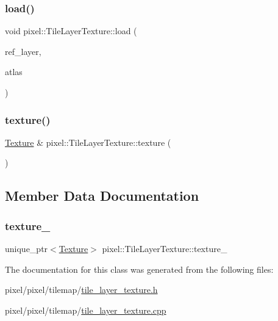 \subsubsection{\texorpdfstring{load()}{load()}}
{\footnotesize\ttfamily void pixel\+::\+Tile\+Layer\+Texture\+::load (\begin{DoxyParamCaption}\item[{\hyperlink{classpixel_1_1_tile_layer}{pixel\+::\+Tile\+Layer} \&}]{ref\+\_\+layer,  }\item[{\hyperlink{classpixel_1_1_tile_atlas}{pixel\+::\+Tile\+Atlas} \&}]{atlas }\end{DoxyParamCaption})}

\mbox{\label{classpixel_1_1_tile_layer_texture_a1523473ccda6c2cc6721aaaa0bce185e}} 
\subsubsection{\texorpdfstring{texture()}{texture()}}
{\footnotesize\ttfamily \hyperlink{classpixel_1_1graphics_1_1_texture}{Texture} \& pixel\+::\+Tile\+Layer\+Texture\+::texture (\begin{DoxyParamCaption}{ }\end{DoxyParamCaption})}



\subsection{Member Data Documentation}
\mbox{\label{classpixel_1_1_tile_layer_texture_aa37d5b79760867af790492c692a4cb36}} 
\subsubsection{\texorpdfstring{texture\+\_\+}{texture\_}}
{\footnotesize\ttfamily unique\+\_\+ptr$<$\hyperlink{classpixel_1_1graphics_1_1_texture}{Texture}$>$ pixel\+::\+Tile\+Layer\+Texture\+::texture\+\_\+\hspace{0.3cm}{\ttfamily [private]}}



The documentation for this class was generated from the following files\+:\begin{DoxyCompactItemize}
\item 
pixel/pixel/tilemap/\hyperlink{tile__layer__texture_8h}{tile\+\_\+layer\+\_\+texture.\+h}\item 
pixel/pixel/tilemap/\hyperlink{tile__layer__texture_8cpp}{tile\+\_\+layer\+\_\+texture.\+cpp}\end{DoxyCompactItemize}
